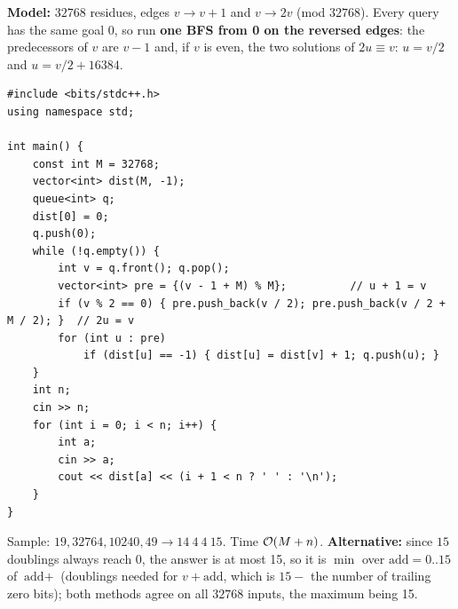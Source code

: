 \begin{solutionbox}
\textbf{Model:} $32768$ residues, edges $v \to v+1$ and $v \to 2v$ (mod $32768$). Every query has the same goal 0, so run \textbf{one BFS from 0 on the reversed edges}: the predecessors of $v$ are $v - 1$ and, if $v$ is even, the two solutions of $2u \equiv v$: $u = v/2$ and $u = v/2 + 16384$.

\begin{center}
\end{center}
\begin{lstlisting}[style=cpp]
#include <bits/stdc++.h>
using namespace std;

int main() {
    const int M = 32768;
    vector<int> dist(M, -1);
    queue<int> q;
    dist[0] = 0;
    q.push(0);
    while (!q.empty()) {
        int v = q.front(); q.pop();
        vector<int> pre = {(v - 1 + M) % M};          // u + 1 = v
        if (v % 2 == 0) { pre.push_back(v / 2); pre.push_back(v / 2 + M / 2); }  // 2u = v
        for (int u : pre)
            if (dist[u] == -1) { dist[u] = dist[v] + 1; q.push(u); }
    }
    int n;
    cin >> n;
    for (int i = 0; i < n; i++) {
        int a;
        cin >> a;
        cout << dist[a] << (i + 1 < n ? ' ' : '\n');
    }
}
\end{lstlisting}
Sample: $19, 32764, 10240, 49 \to 14\ 4\ 4\ 15$. Time $\mathcal{O}(M + n)$. \textbf{Alternative:} since $15$ doublings always reach 0, the answer is at most 15, so it is $\min$ over $\text{add} = 0..15$ of $\text{add} + $ (doublings needed for $v + \text{add}$, which is $15 - $ the number of trailing zero bits); both methods agree on all $32768$ inputs, the maximum being 15.
\end{solutionbox}

